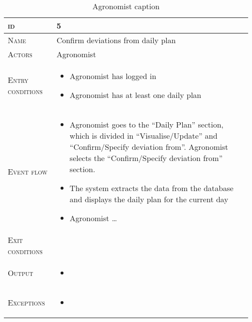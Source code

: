 \begin{table}[H]
    \centering
    \begin{tabular}[c]{|l|p{}|}
        \hline %
    	\textsc{id}                 &   5\\
    	\hline %
    	\textsc{Name}               &   Confirm deviations from daily plan\\
    	\hline %
    	\textsc{Actors}             &   Agronomist\\
    	\hline %
    	\textsc{Entry conditions}   &   \begin{itemize}
                                    	    \item Agronomist has logged in
                                    	    \item Agronomist has at least one daily plan
                                        \end{itemize}\\
    	\hline %
    	\textsc{Event flow}         &   \footnotesize
            	                        \begin{itemize}
                                    	    \item Agronomist goes to the “Daily Plan” section, which is divided in “Visualise/Update” and “Confirm/Specify deviation from”. Agronomist selects the “Confirm/Specify deviation from” section.
                                    		\item The system extracts the data from the database and displays the daily plan for the current day
                                    		\item Agronomist  \ldots %
                                        \end{itemize}\\
        \hline %
        \textsc{Exit conditions}    &  %
        \\
    	\hline %
    	\textsc{Output}             &  \begin{itemize}
    	    \item %
    	\end{itemize}\\
    	\hline %
    	\textsc{Exceptions}         &  \begin{itemize}
    	    \item %
    	\end{itemize}\\
    	
    	\hline %
        
    \end{tabular}
    \caption{\label{tab:confirm_deviations_section}Agronomist caption }
\end{table}